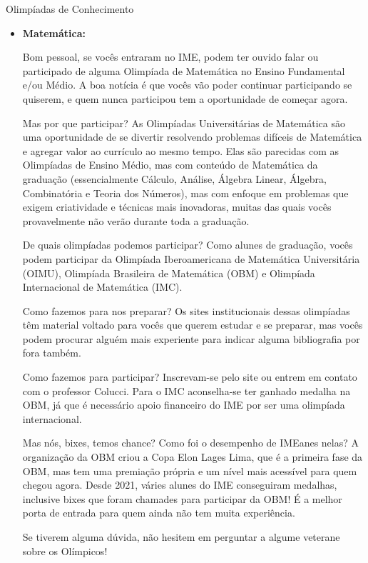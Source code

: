 \begin{subsecao}{Olimpíadas de Conhecimento}

\begin{itemize}

\item{\bf Matemática: }

Bom pessoal, se vocês entraram no IME, podem ter ouvido falar ou participado
de alguma Olimpíada de Matemática no Ensino Fundamental e/ou Médio. A
boa notícia é que vocês vão poder continuar participando se quiserem,
e quem nunca participou tem a oportunidade de começar agora.

Mas por que participar? As Olimpíadas Universitárias de Matemática são uma
oportunidade de se divertir resolvendo problemas difíceis de Matemática e agregar
valor ao currículo ao mesmo tempo. Elas são parecidas com as Olimpíadas de
Ensino Médio, mas com conteúdo de Matemática da graduação (essencialmente
Cálculo, Análise, Álgebra Linear, Álgebra, Combinatória e Teoria dos Números),
mas com enfoque em problemas que exigem criatividade e técnicas mais inovadoras,
muitas das quais vocês provavelmente não verão durante toda a graduação.

De quais olimpíadas podemos participar? Como alunes de graduação, vocês podem
participar da Olimpíada Iberoamericana de Matemática Universitária (OIMU),
Olimpíada Brasileira de Matemática (OBM) e Olimpíada Internacional de
Matemática (IMC).

Como fazemos para nos preparar? Os sites institucionais dessas olimpíadas
têm material voltado para vocês que querem estudar e se preparar, mas vocês
podem procurar alguém mais experiente para indicar alguma bibliografia por fora
também. 

Como fazemos para participar? Inscrevam-se pelo site ou entrem em contato com
o professor Colucci. Para o IMC aconselha-se ter ganhado medalha na OBM,
já que é necessário apoio financeiro do IME por ser uma olimpíada internacional.

Mas nós, bixes, temos chance? Como foi o desempenho de IMEanes nelas? A organização 
da OBM criou a Copa Elon Lages Lima, que é a primeira fase da OBM, mas tem uma 
premiação própria e um nível mais acessível para quem chegou agora. Desde 2021, 
váries alunes do IME conseguiram medalhas, inclusive bixes que foram chamades para participar 
da OBM! É a melhor porta de entrada para quem ainda não tem muita experiência. 

Se tiverem alguma dúvida, não hesitem em perguntar a algume veterane sobre os
Olímpicos!


\end{itemize}
\end{subsecao}
